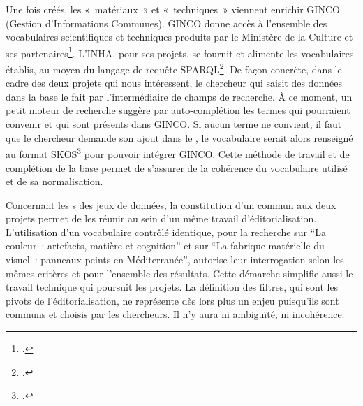 Une fois créés, les  « matériaux » et « techniques » viennent enrichir GINCO (Gestion d’Informations Communes). GINCO donne accès à l’ensemble des vocabulaires scientifiques et techniques produits par le Ministère de la Culture et ses partenaires\footcite[En 2024, le logiciel n’est plus maintenu à jour et semble voué à disparaître.]{ministere_charge_de_la_culture_culturecommunicationginco_2022}. L’INHA, pour ses projets, se fournit et alimente les vocabulaires établis, au  moyen du langage de requête SPARQL\footcite{inha_thesaurus_nodate}. De façon concrète, dans le cadre des deux projets qui nous intéressent, le chercheur qui saisit des données dans la base le fait par l’intermédiaire de champs de recherche. À ce moment, un petit moteur de recherche suggère par auto-complétion les termes qui pourraient convenir et qui sont présents dans GINCO. Si aucun terme ne convient, il faut que le chercheur demande son ajout dans le , le vocabulaire serait alors renseigné au format SKOS\footcite[« SKOS (Simple Knowledge Organisation System ou Système simple d’organisation des connaissances) est un langage de représentation de schémas de concepts, ce qui recouvre les langages documentaires tels que les , classifications, listes de vedettes matière, taxonomies, folksonomies, etc. Son nom a été choisi pour mettre en évidence l’objectif même visé par ce langage : proposer un système permettant d’exprimer et de gérer des modèles interprétables par les machines dans la perspective du web sémantique », ][]{lenart_skos_2007} pour pouvoir intégrer GINCO. Cette méthode de travail et de complétion de la base permet de s’assurer de la cohérence du vocabulaire utilisé et de sa normalisation.

Concernant les s des jeux de données, la constitution d’un  commun aux deux projets permet de les réunir au sein d’un même travail d’éditorialisation. L’utilisation d’un vocabulaire contrôlé identique, pour la recherche sur \enquote{La couleur~: artefacts, matière et cognition} et sur \enquote{La fabrique matérielle du visuel~: panneaux peints en Méditerranée}, autorise leur interrogation selon les mêmes critères et pour l’ensemble des résultats. Cette démarche simplifie aussi le travail technique qui poursuit les projets. La définition des filtres, qui sont les pivots de l’éditorialisation, ne représente dès lors plus un enjeu puisqu’ils sont communs et choisis par les chercheurs. Il n’y aura ni ambiguïté, ni incohérence. \newpage

